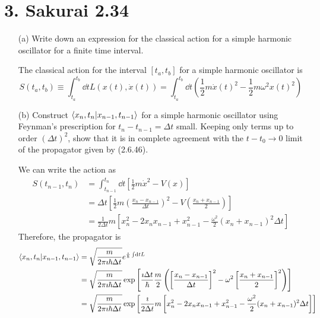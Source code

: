 \documentclass[a4paper,twoside]{article}
\begin{document}
\section*{3. Sakurai 2.34}
\begin{itemize}
    \item[(a)] Write down an expression for the classical action for a simple harmonic oscillator for a finite time interval.
        \begin{problem}
            The classical action for the interval $ [t_a, t_b] $ for a simple harmonic oscillator is
            \begin{equation}
                S(t_a, t_b) \equiv \int_{t_a}^{t_b} \dd{t} L(x(t), \dot{x}(t)) = \int_{t_a}^{t_b} \dd{t} \left( \frac{1}{2} m\dot{x}(t)^2 - \frac{1}{2} m \omega^2 x(t)^2 \right)
            \end{equation}
        \end{problem}
    \item[(b)] Construct $\bra{x_n, t_n}\ket{x_{n-1}, t_{n-1}} $ for a simple harmonic oscillator using Feynman's prescription for $ t_n - t_{n-1} = \Delta t $ small. Keeping only terms up to order $ (\Delta t)^2 $, show that it is in complete agreement with the $ t - t_0 \to 0 $ limit of the propagator given by (2.6.46).
        \begin{problem}
            We can write the action as
            \begin{align}
                S(t_{n-1}, t_n) &= \int_{t_{n-1}}^{t_n} \dd{t} \left[ \frac{1}{2} m\dot{x}^2 - V(x) \right] \\
                &= \Delta t \left[ \frac{1}{2} m \left( \frac{x_n - x_{n-1}}{\Delta t} \right)^2 - V\left( \frac{x_n + x_{n-1}}{2} \right) \right] \\
                &= \frac{1}{2 \Delta t} m \left[ x^2_n - 2 x_n x_{n-1} + x^2_{n-1} - \frac{\omega^2}{2} (x_n + x_{n-1})^2 \Delta t \right]
            \end{align}
            Therefore, the propagator is
            \begin{align}
                \bra{x_n, t_n}\ket{x_{n-1}, t_{n-1}} &= \sqrt{\frac{m}{2 \pi \imath \hbar \Delta t}} e^{\frac{\imath}{\hbar} \int \dd{t} L} \\
                &= \sqrt{\frac{m}{2 \pi \imath \hbar \Delta t}} \exp\left[ \frac{\imath \Delta t}{\hbar} \frac{m}{2} \left( \left[ \frac{x_n - x_{n-1}}{\Delta t} \right]^2 - \omega^2 \left[ \frac{x_n + x_{n-1}}{2} \right]^2\right) \right]\\
                &= \sqrt{\frac{m}{2 \pi \imath \hbar \Delta t}} \exp \left[ \frac{\imath}{2 \Delta t} m \left[ x^2_n - 2 x_n x_{n-1} + x^2_{n-1} - \frac{\omega^2}{2} (x_n + x_{n-1})^2 \Delta t \right] \right]

\end{align}
\end{problem}
\end{itemize}
\end{document}
